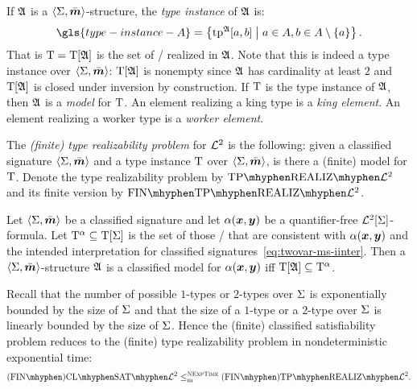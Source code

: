 If $\mathfrak{A}$ is a $\left\langle \mathrm{\Sigma},\bar{\bm{m}} \right\rangle$-structure, the \emph{type instance} of $\mathfrak{A}$
is:
\[
  \gls{type-instance-A} = \setbd{\tpIab\StrA\ea\eb}{
    \ea \in \domA, \eb \in \domA \sub\set\ea}.
\]
That is $\mathrm{T} = \mathrm{T}[\mathfrak{A}]$ is the set of \twotypes/ realized in $\mathfrak{A}$.
Note that this is indeed a type instance over $\left\langle \mathrm{\Sigma},\bar{\bm{m}} \right\rangle$:
$\mathrm{T}[\mathfrak{A}]$ is nonempty since $\mathfrak{A}$ has cardinality at least $2$
and $\mathrm{T}[\mathfrak{A}]$ is closed under inversion by construction.
If $\mathrm{T}$ is the type instance of $\mathfrak{A}$, then $\mathfrak{A}$ is a \emph{model} for
$\mathrm{T}$.
An element realizing a king type is a \emph{king element}.
An element realizing a worker type is a \emph{worker element}.

\begin{definition}
The \emph{(finite) type realizability problem} for $\mathcal{L}^{2}$ is the following:
given a classified signature $\left\langle \mathrm{\Sigma},\bar{\bm{m}} \right\rangle$ and a type instance $\mathrm{T}$ over
$\left\langle \mathrm{\Sigma},\bar{\bm{m}} \right\rangle$, is there a (finite) model for $\mathrm{T}$.
Denote the type realizability problem by $\Real{\vFo2}$ and its finite version
by $\FinReal{\vFo2}$.
\end{definition}

\begin{remark}\label{rem:red-sat-to-real}
Let $\left\langle \mathrm{\Sigma},\bar{\bm{m}} \right\rangle$ be a classified signature and let $\alpha(\bm{x},\bm{y})$ be a
quantifier-free $\mathcal{L}^{2}[\mathrm{\Sigma}]$-formula.
Let $\mathrm{T}^\alpha \subseteq \mathrm{T}[\mathrm{\Sigma}]$ is the set of those \twotypes/ that are
consistent with $\alpha(\bm{x},\bm{y})$ and the intended interpretation
for classified signatures~\cref{eq:twovar-ms-iinter}.
Then a $\left\langle \mathrm{\Sigma},\bar{\bm{m}} \right\rangle$-structure $\mathfrak{A}$ is a classified model for
$\alpha(\bm{x},\bm{y})$ iff $\mathrm{T}[\mathfrak{A}] \subseteq \mathrm{T}^\alpha$.

Recall that the number of possible $1$-types or $2$-types over $\mathrm{\Sigma}$ is
exponentially bounded by the size of $\mathrm{\Sigma}$ and that the size of a $1$-type or
a $2$-type over $\mathrm{\Sigma}$ is linearly bounded by the size of $\mathrm{\Sigma}$.
Hence the (finite) classified satisfiability problem reduces to the
(finite) type realizability problem in nondeterministic exponential time:
\[
  \FinAClSat{\vFo2} \red\cNExpTime \FinAReal{\vFo2}.
\]
\end{remark}

